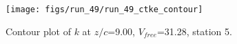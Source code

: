\begin{figure}[H]
\centering
\texttt{[image: figs/run\_49/run\_49\_ctke\_contour]}
\caption{Contour plot of $k$ at $z/c$=9.00, $V_{free}$=31.28, station 5.}
\end{figure}


